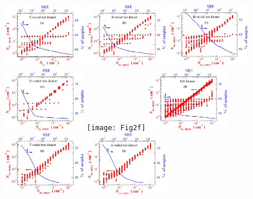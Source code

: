 \documentclass[journal]{IEEEtran}
\begin{document}
\begin{figure}[tb]
\centering
\includegraphics[width=0.32\textwidth]{Fig2b}
\includegraphics[width=0.32\textwidth]{Fig2c}
\includegraphics[width=0.32\textwidth]{Fig2d}
\includegraphics[width=0.32\textwidth]{Fig2e}
\texttt{[image: Fig2f]}
\includegraphics[width=0.32\textwidth]{Fig2g}
\includegraphics[width=0.32\textwidth]{Fig22b}
\includegraphics[width=0.32\textwidth]{Fig22c}

\end{figure}
\end{document}
